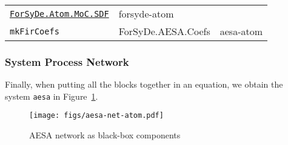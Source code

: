 \documentclass[
  a4paper,
]{article}
\newenvironment{Shaded}{}{}
\newcommand{\DataTypeTok}[1]{\textcolor[rgb]{0.56,0.13,0.00}{#1}}
\newcommand{\FunctionTok}[1]{\textcolor[rgb]{0.02,0.16,0.49}{#1}}
\newcommand{\KeywordTok}[1]{\textcolor[rgb]{0.00,0.44,0.13}{\textbf{#1}}}
\newcommand{\NormalTok}[1]{#1}
\newcommand{\OtherTok}[1]{\textcolor[rgb]{0.00,0.44,0.13}{#1}}
\begin{document}
\begin{longtable}[]{@{}lll@{}}
\begin{minipage}[t]{0.42\columnwidth}
\href{https://forsyde.github.io/forsyde-atom/api/ForSyDe-Atom-MoC-SDF.html}{\texttt{ForSyDe.Atom.MoC.SDF}}\strut
\end{minipage} & \begin{minipage}[t]{0.28\columnwidth}\raggedright
forsyde-atom\strut
\end{minipage}\tabularnewline
\begin{minipage}[t]{0.21\columnwidth}\raggedright
\texttt{mkFirCoefs}\strut
\end{minipage} & \begin{minipage}[t]{0.42\columnwidth}\raggedright
ForSyDe.AESA.Coefs\strut
\end{minipage} & \begin{minipage}[t]{0.28\columnwidth}\raggedright
aesa-atom\strut
\end{minipage}\tabularnewline
\bottomrule
\end{longtable}

\hypertarget{system-process-network-1}{%
\subsubsection{System Process Network}\label{system-process-network-1}}

Finally, when putting all the blocks together in an equation, we obtain
the system \texttt{aesa\textquotesingle{}} in
Figure~\ref{fig:aesa-net-atom}.

\begin{figure}
\hypertarget{fig:aesa-net-atom}{%
\centering
\texttt{[image: figs/aesa-net-atom.pdf]}
\caption{AESA network as black-box components}\label{fig:aesa-net-atom}
}
\end{figure}

\begin{Shaded}
\end{Shaded}
\end{document}
